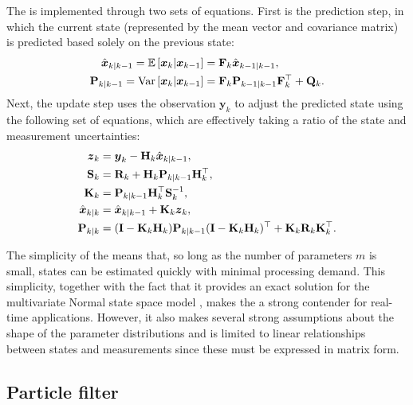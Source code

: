 The \kf{} is implemented through two sets of equations. First is the prediction step, in which the current state (represented by the mean vector and covariance matrix) is predicted based solely on the previous state:
\begin{equation}
\label{eq:ch2:kf_predict}
\begin{split}
\hat{\boldsymbol x}_{k|k-1} = \mathbb{E}\left[\boldsymbol x_k | \boldsymbol x_{k-1}\right]
    &= \mathbf{F}_k \hat{\boldsymbol x}_{k-1|k-1}, \\
\mathbf{P}_{k|k-1} = \mathrm{Var}\left[\boldsymbol x_k | \boldsymbol x_{k-1}\right]
    &= \mathbf{F}_k \mathbf{P}_{k-1|k-1} \mathbf{F}_k^\top + \mathbf{Q}_k.
\end{split}
\end{equation}
Next, the update step uses the observation $\boldsymbol{y}_k$ to adjust the predicted state using the following set of equations, which are effectively taking a ratio of the state and measurement uncertainties:
\begin{equation}
\label{eq:ch2:kf_update}
\begin{split}
\boldsymbol z_k &= \boldsymbol{y}_k - \mathbf{H}_k \hat{\boldsymbol x}_{k|k-1}, \\
\mathbf{S}_k &= \mathbf{R}_k + \mathbf{H}_k \mathbf{P}_{k|k-1} \mathbf{H}_k^\top, \\
\mathbf{K}_k &= \mathbf{P}_{k|k-1} \mathbf{H}_k^\top \mathbf{S}_k^{-1}, \\
\hat{\boldsymbol x}_{k|k} &= \hat{\boldsymbol x}_{k|k-1} + \mathbf{K}_k \boldsymbol z_k, \\
\mathbf{P}_{k|k} &= (\mathbf{I} - \mathbf{K}_k \mathbf{H}_k) \mathbf{P}_{k|k-1}
    (\mathbf{I} - \mathbf{K}_k \mathbf{H}_k)^\top + \mathbf{K}_k \mathbf{R}_k \mathbf{K}_k^\top.
\end{split}
\end{equation}


The simplicity of the \kf{} means that, so long as the number of parameters $m$ is small, states can be estimated quickly with minimal processing demand. This simplicity, together with the fact that it provides an exact solution for the multivariate Normal state space model \citep{Anderson_1979}, makes the \kf{} a strong contender for real-time applications. However, it also makes several strong assumptions about the shape of the parameter distributions and is limited to linear relationships between states and measurements since these must be expressed in matrix form.



\subsection{Particle filter}
\label{sec:pf}

